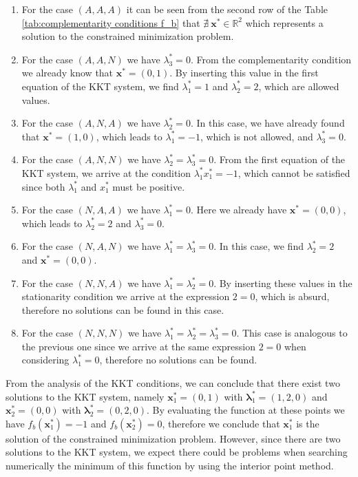 \documentclass[a4paper,11pt]{article}
\begin{document}
\begin{enumerate}
	\item For the case $(A, A, A)$ it can be seen from the second row of the Table \ref{tab:complementarity conditions f_b} that $\nexists \ \textbf{x}^* \in \mathbb{R}^{2}$ which represents a solution to the constrained minimization problem.
	\item For the case $(A, A, N)$ we have $\lambda_{3}^*=0$. From the complementarity condition we already know that $\textbf{x}^*=(0,1)$. By inserting this value in the first equation of the KKT system, we find $\lambda_{1}^*=1$ and $\lambda_{2}^*=2$, which are allowed values.
	\item For the case $(A, N, A)$ we have $\lambda_{2}^*=0$. In this case, we have already found that $\textbf{x}^*=(1,0)$, which leads to $\lambda_{1}^*=-1$, which is not allowed, and $\lambda_{3}^*=0$.
	\item For the case $(A, N, N)$ we have $\lambda_{2}^*=\lambda_{3}^*=0$. From the first equation of the KKT system, we arrive at the condition $\lambda_{1}^* x_{1}^*=-1$, which cannot be satisfied since both $\lambda_{1}^*$ and $x_{1}^*$ must be positive.
	\item For the case $(N, A, A)$ we have $\lambda_{1}^*=0$. Here we already have $\textbf{x}^*=(0,0)$, which leads to $\lambda_{2}^*=2$ and $\lambda_{3}^*=0$.
	\item For the case $(N, A, N)$ we have $\lambda_{1}^*=\lambda_{3}^*=0$. In this case, we find $\lambda_{2}^*=2$ and $\textbf{x}^*=(0,0)$.
	\item For the case $(N, N, A)$ we have $\lambda_{1}^*=\lambda_{2}^*=0$. By inserting these values in the stationarity condition we arrive at the expression $2=0$, which is absurd, therefore no solutions can be found in this case.
	\item For the case $(N, N, N)$ we have $\lambda_{1}^*=\lambda_{2}^*=\lambda_{3}^*=0$. This case is analogous to the previous one since we arrive at the same expression $2=0$ when considering $\lambda_{1}^*=0$, therefore no solutions can be found.
\end{enumerate}
From the analysis of the KKT conditions, we can conclude that there exist two solutions to the KKT system, namely $\textbf{x}_{1}^*=(0,1)$ with $\boldsymbol{\lambda}_{1}^*=(1,2,0)$ and $\textbf{x}_{2}^*=(0,0)$ with $\boldsymbol{\lambda}_{2}^*=(0,2,0)$. By evaluating the function at these points we have $f_{b}(\textbf{x}_{1}^*)=-1$ and  $f_{b}(\textbf{x}_{2}^*)=0$, therefore we conclude that $\textbf{x}_{1}^*$ is the solution of the constrained minimization problem. However, since there are two solutions to the KKT system, we expect there could be problems when searching numerically the minimum of this function by using the interior point method.
\end{document}
